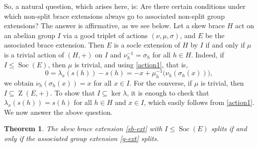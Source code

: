 \documentclass[11pt]{amsart}
\theoremstyle{thrm}
\theoremstyle{plain}
\newtheorem{thm}{Theorem}[section]
\theoremstyle{definition}
\newcommand{\Z}{\operatorname{Z} }
\newcommand{\Soc}{\operatorname{Soc} }
\numberwithin{equation}{section}
\begin{document}
So, a natural question, which arises here, is: Are there certain conditions under which  non-split brace extensions  always go to associated  non-split group extensions?  The answer is affirmative, as we see below. Let a skew brace $H$ act on an abelian group $I$ via a good triplet of actions $(\nu, \mu, \sigma)$, and $E$ be the associated brace extension. Then  $E$ is  a  socle extension of $H$ by $I$ if and only if $\mu$ is a trivial action of $(H, +)$ on $I$ and $\nu_h^{-1} = \sigma_h$ for all $h \in H$.  Indeed,
if $I \le \Soc(E)$, then $\mu$ is trivial, and using  \eqref{action1}, that is,
\[
0 = \lambda_x(s(h)) - s(h) = -x + \mu_{h}^{-1}\bigl(\nu_h(\sigma_h(x))\bigr),
\]  
we obtain $\nu_h(\sigma_h(x)) = x$ for all $x \in I$.  
For the converse, if $\mu$ is trivial, then $I \subseteq \Z(E,+)$.  
To show that $I \subseteq \ker \lambda$, it is enough to check that $\lambda_x(s(h)) = s(h)$ for all $h \in H$ and $x \in I$, which easily follows from \eqref{action1}.  We now answer the above question.

\begin{thm}\label{prop-split-ext}
	The skew brace extension \eqref{sb-ext}  with $I \le \Soc(E)$ splits if and only if  the associated group extension \eqref{g-ext} splits.
\end{thm}
\end{document}
